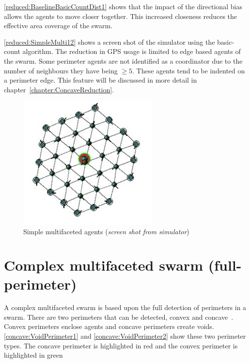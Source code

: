 \autoref{reduced:BaselineBasicCountDist1} shows that the impact of the directional bias allows the agents to move closer together. This increased closeness reduces the effective area coverage of the swarm. 

\autoref{reduced:SimpleMulti12} shows a screen shot of the simulator using the basic-count algorithm. The reduction in GPS usage is limited to edge based agents of the swarm. Some perimeter agents are not identified as a coordinator due to the number of neighbours they have being $\geq5$. These agents tend to be indented on a perimeter edge. This feature will be discussed in more detail in chapter~\ref{chapter:ConcaveReduction}.

\begin{figure}[H]
\begin{center}
\includegraphics[width=7cm]{CHAPTER-6/figures/SimpleMulti2}
\end{center}
\caption[Simple multifaceted agents]{Simple multifaceted agents (\textit{screen shot from simulator})\label{reduced:SimpleMulti12}}
\end{figure}

\section{Complex multifaceted swarm (full-perimeter)}\label{sec:complexMulti} 
A complex multifaceted swarm is based upon the full detection of perimeters in a swarm. There are two perimeters that can be detected, convex and concave~\cite{MD:09,MJ:08}. Convex perimeters enclose agents and concave perimeters create voids. \autoref{concave:VoidPerimeter1} and \autoref{concave:VoidPerimeter2} show these two perimeter types. The concave perimeter is highlighted in red and the convex perimeter is highlighted in green

